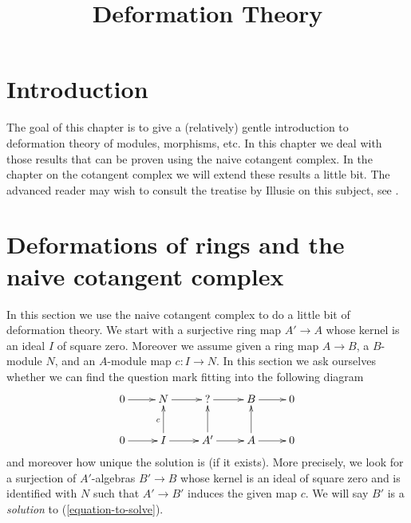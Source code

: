 

%


\title{Deformation Theory}


\maketitle

\label{section-phantom}

\tableofcontents

\section{Introduction}
\label{section-introduction}

\noindent
The goal of this chapter is to give a (relatively) gentle introduction to
deformation theory of modules, morphisms, etc. In this chapter we deal with
those results that can be proven using the naive cotangent complex. In
the chapter on the cotangent complex we will extend these results a little
bit. The advanced reader may wish to consult the treatise by Illusie on this
subject, see \cite{cotangent}.





\section{Deformations of rings and the naive cotangent complex}
\label{section-deformations}

\noindent
In this section we use the naive cotangent complex to do a little bit
of deformation theory. We start with a surjective ring map $A' \to A$
whose kernel is an ideal $I$ of square zero. Moreover we assume
given a ring map $A \to B$, a $B$-module $N$, and an $A$-module map
$c : I \to N$. In this section we ask ourselves whether we can find
the question mark fitting into the following diagram
\begin{equation}
\label{equation-to-solve}
\vcenter{
\xymatrix{
0 \ar[r] & N \ar[r] & {?} \ar[r] & B \ar[r] & 0 \\
0 \ar[r] & I \ar[u]^c \ar[r] & A' \ar[u] \ar[r] & A \ar[u] \ar[r] & 0
}
}
\end{equation}
and moreover how unique the solution is (if it exists). More precisely,
we look for a surjection of $A'$-algebras $B' \to B$ whose kernel is
an ideal of square zero and is
identified with $N$ such that $A' \to B'$ induces the given map $c$.
We will say $B'$ is a {\it solution} to (\ref{equation-to-solve}).

